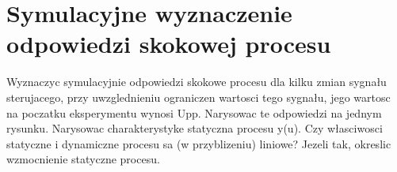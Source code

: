 \section{Symulacyjne wyznaczenie odpowiedzi skokowej procesu}
Wyznaczyc symulacyjnie odpowiedzi skokowe procesu dla kilku zmian sygnału sterujacego,
przy uwzglednieniu ograniczen wartosci tego sygnału, jego wartosc na poczatku
eksperymentu wynosi Upp. Narysowac te odpowiedzi na jednym rysunku. Narysowac
charakterystyke statyczna procesu y(u). Czy własciwosci statyczne i dynamiczne procesu
sa (w przyblizeniu) liniowe? Jezeli tak, okreslic wzmocnienie statyczne procesu.


